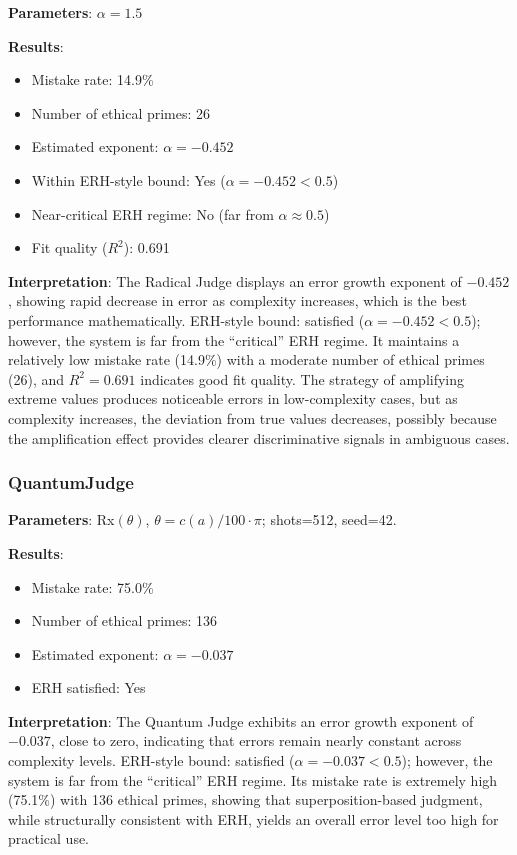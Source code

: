 \documentclass[12pt,a4paper]{article}
\theoremstyle{definition}
\theoremstyle{remark}
\begin{document}
\textbf{Parameters}: $\alpha = 1.5$

\textbf{Results}:
\begin{itemize}
    \item Mistake rate: 14.9\%
    \item Number of ethical primes: 26
    \item Estimated exponent: $\alpha = -0.452$
    \item Within ERH-style bound: Yes ($\alpha = -0.452 < 0.5$)
    \item Near-critical ERH regime: No (far from $\alpha \approx 0.5$)
    \item Fit quality ($R^2$): 0.691
\end{itemize}

\textbf{Interpretation}: The Radical Judge displays an error growth exponent of $-0.452$, showing rapid decrease in error as complexity increases, which is the best performance mathematically. ERH-style bound: satisfied ($\alpha = -0.452 < 0.5$); however, the system is far from the ``critical'' ERH regime. It maintains a relatively low mistake rate (14.9\%) with a moderate number of ethical primes (26), and $R^2 = 0.691$ indicates good fit quality. The strategy of amplifying extreme values produces noticeable errors in low-complexity cases, but as complexity increases, the deviation from true values decreases, possibly because the amplification effect provides clearer discriminative signals in ambiguous cases.

\subsubsection{QuantumJudge}

\textbf{Parameters}: Rx$(\theta)$, $\theta = c(a)/100 \cdot \pi$; shots=512, seed=42.

\textbf{Results}:
\begin{itemize}
    \item Mistake rate: 75.0\%
    \item Number of ethical primes: 136
    \item Estimated exponent: $\alpha = -0.037$
    \item ERH satisfied: Yes
\end{itemize}

\textbf{Interpretation}: The Quantum Judge exhibits an error growth exponent of $-0.037$, close to zero, indicating that errors remain nearly constant across complexity levels. ERH-style bound: satisfied ($\alpha = -0.037 < 0.5$); however, the system is far from the ``critical'' ERH regime. Its mistake rate is extremely high (75.1\%) with 136 ethical primes, showing that superposition-based judgment, while structurally consistent with ERH, yields an overall error level too high for practical use.
\end{document}
